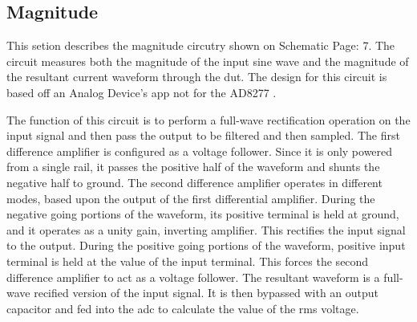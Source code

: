 \subsection{Magnitude}

This setion describes the magnitude circutry shown on Schematic Page: 7. The circuit measures both the magnitude of the input sine wave and the magnitude of the resultant current waveform through the \gls{dut}. The design for this circuit is based off an Analog Device's app not for the AD8277 \cite{absCircuit}.

The function of this circuit is to perform a full-wave rectification operation on the input signal and then pass the output to be filtered and then sampled. The first difference amplifier is configured as a voltage follower. Since it is only powered from a single rail, it passes the positive half of the waveform and shunts the negative half to ground. The second difference amplifier operates in different modes, based upon the output of the first differential amplifier. During the negative going portions of the waveform, its positive terminal is held at ground, and it operates as a unity gain, inverting amplifier. This rectifies the input signal to the output. During the positive going portions of the waveform, positive input terminal is held at the value of the input terminal. This forces the second difference amplifier to act as a voltage follower. The resultant waveform is a full-wave recified version of the input signal. It is then bypassed with an output capacitor and fed into the \gls{adc} to calculate the value of the rms voltage.

